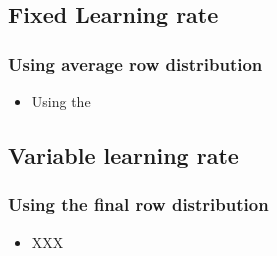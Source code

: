 \documentclass[handout]{beamer}
\begin{document}
\subsection{Fixed Learning rate}
\begin{frame}
\frametitle{Using average row distribution}
\begin{itemize}
\item Using the 
\end{itemize}
\end{frame}

\subsection{Variable learning rate}
\begin{frame}
\frametitle{Using the final row distribution}
\begin{itemize}
\item XXX
\end{itemize}
\end{frame}


\end{document}
